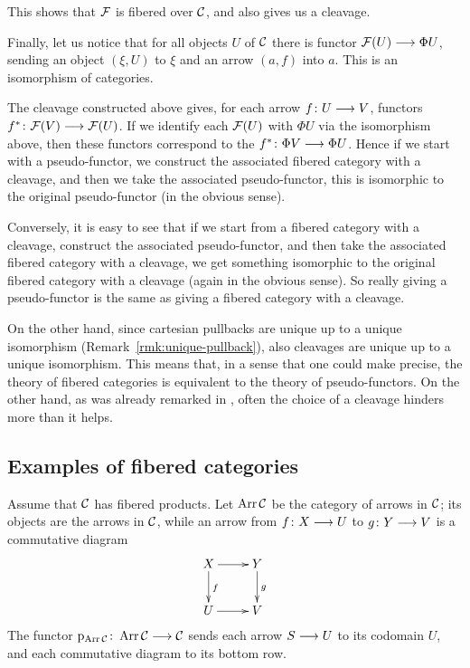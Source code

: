 \begin{3   FIBERED CATEGORIES}
\begin{3.1 Fibered categories}
This shows that $\mathcal{F}$ is fibered over $\mathcal{C}$, and also gives us a cleavage.

Finally, let us notice that for all objects $U$ of $\mathcal{C}$ there is functor $\cF(U) \arr \Phi U$, sending an object $(\xi, U)$ to $\xi$ and an arrow $(a, f)$ into $a$. This is an isomorphism of categories.

The cleavage constructed above gives, for each arrow $f \colon U \arr V$, functors $f^* \colon \cF(V) \arr \cF(U)$. If we identify each $\mathcal{F}(U)$ with $\Phi U$ via the isomorphism above, then these functors correspond to the $f^* \colon \Phi V \arr \Phi U$. Hence if we start with a pseudo-functor, we construct the associated fibered category with a cleavage, and then we take the associated pseudo-functor, this is isomorphic to the original pseudo-functor (in the obvious sense).

Conversely, it is easy to see that if we start from a fibered category with a cleavage, construct the associated pseudo-functor, and then take the associated fibered category with a cleavage, we get something isomorphic to the original fibered category with a cleavage (again in the obvious sense). So really giving a pseudo-functor is the same as giving a fibered category with a cleavage.

On the other hand, since cartesian pullbacks are unique up to a unique isomorphism (Remark~\ref{rmk:unique-pullback}), also cleavages are unique up to a unique isomorphism. This means that, in a sense that one could make precise, the theory of fibered categories is equivalent to the theory of pseudo-functors. On the other hand, as was already remarked in \cite[Remarque, pp.~193--194]{sga1}, often the choice of a cleavage hinders more than it helps.

\end{3.1 Fibered categories}
\begin{3.2 Examples of fibered categories}
\setcounter{section}{1}
\section{Examples of fibered categories}\label{sec:examples-fibered}

\begin{example}\label{ex:arrows} Assume that $\mathcal{C}$ has fibered products. Let $\operatorname{Arr} \mathcal{C}$ be the category of arrows in $\mathcal{C}$; its objects are the arrows in $\mathcal{C}$, while an arrow from $f\colon X \arr U$ to $g \colon Y \arr V$ is a commutative diagram
   \[
   \xymatrix{
   X\ar[r] \ar[d]^f & Y \ar[d]^g\\
   U\ar[r] & V
   }
   \]
The functor $\p_{\Arr \cC}\colon \Arr \cC\arr \cC$ sends each arrow $S \arr U$ to its codomain $U$, and each commutative diagram to its bottom row.


\end{example}
\end{3.2 Examples of fibered categories}
\end{3   FIBERED CATEGORIES}
